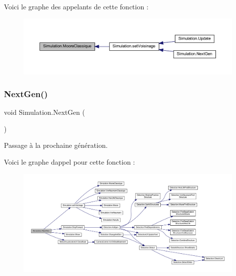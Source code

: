 Voici le graphe des appelants de cette fonction \+:
\nopagebreak
\begin{figure}[H]
\begin{center}
\leavevmode
\includegraphics[width=350pt]{class_simulation_a39f92768aa24cee944387315749314ad_icgraph}
\end{center}
\end{figure}
\mbox{\label{class_simulation_a6027638c71846ed03d560cd75d8a92d6}} 
\subsubsection{\texorpdfstring{Next\+Gen()}{NextGen()}}
{\footnotesize\ttfamily void Simulation.\+Next\+Gen (\begin{DoxyParamCaption}{ }\end{DoxyParamCaption})\hspace{0.3cm}{\ttfamily [inline]}}



Passage à la prochaine génération. 

Voici le graphe d\textquotesingle{}appel pour cette fonction \+:
\nopagebreak
\begin{figure}[H]
\begin{center}
\leavevmode
\includegraphics[width=350pt]{class_simulation_a6027638c71846ed03d560cd75d8a92d6_cgraph}
\end{center}
\end{figure}
\mbox{\label{class_simulation_ab668bfea667549d1295fc55f5ccfbc4a}} 
